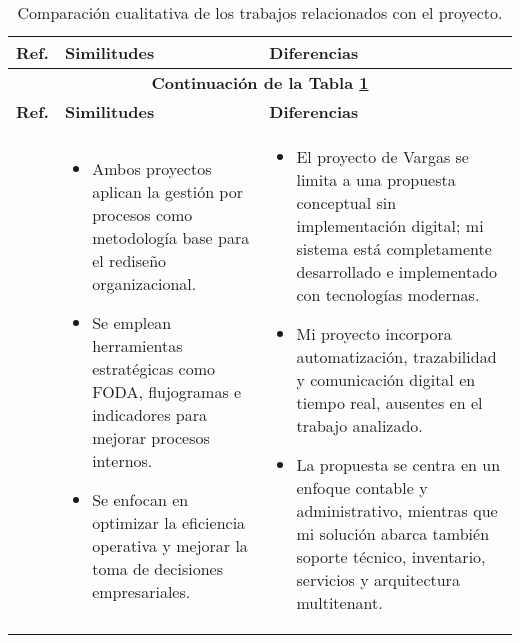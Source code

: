 \begin{longtable}{m{.05\paperwidth} *{2}{m{.33\paperwidth}} @{}}
	\caption{Comparación cualitativa de los trabajos relacionados con el proyecto.}
	\label{table:trabajosRelacionados}\\
	\hline
	\textbf{Ref.} & \textbf{Similitudes} & \textbf{Diferencias} \\
	\hline
	\endfirsthead
	
	\multicolumn{3}{c}{\textbf{Continuación de la Tabla \ref{table:trabajosRelacionados}}} \\
	\hline
	\textbf{Ref.} & \textbf{Similitudes} & \textbf{Diferencias} \\
	\hline
	\endhead
	\hline
	\endlastfoot

\cite{Vargas2018} &
\begin{itemize}[topsep=0pt,itemsep=0pt,parsep=0pt,partopsep=0pt,leftmargin=*]
	\item Ambos proyectos aplican la gestión por procesos como metodología base para el rediseño organizacional.
	\item Se emplean herramientas estratégicas como FODA, flujogramas e indicadores para mejorar procesos internos.
	\item Se enfocan en optimizar la eficiencia operativa y mejorar la toma de decisiones empresariales.
\end{itemize} &
\begin{itemize}[topsep=0pt,itemsep=0pt,parsep=0pt,partopsep=0pt,leftmargin=*]
	\item El proyecto de Vargas se limita a una propuesta conceptual sin implementación digital; mi sistema está completamente desarrollado e implementado con tecnologías modernas.
	\item Mi proyecto incorpora automatización, trazabilidad y comunicación digital en tiempo real, ausentes en el trabajo analizado.
	\item La propuesta se centra en un enfoque contable y administrativo, mientras que mi solución abarca también soporte técnico, inventario, servicios y arquitectura multitenant.
\end{itemize} \\
\midrule


\end{longtable}
